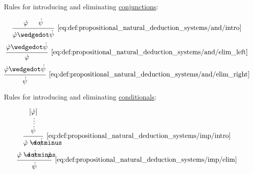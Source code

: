 \begin{definition}
\begin{thmenum}
     Rules for introducing and eliminating \hyperref[def:propositional_alphabet/connectives/conjunction]{conjunctions}:
    \begin{ThreeColumns}
      \begin{equation*}\taglabel[\( \wedge^+ \)]{eq:def:propositional_natural_deduction_systems/and/intro}
        \begin{prooftree}
          \hypo{ \syn\varphi }
          \hypo{ \syn\psi }
          \infer2[\ref{eq:def:propositional_natural_deduction_systems/and/intro}]{ \syn\varphi \synwedge \syn\psi }
        \end{prooftree}
      \end{equation*}
    \BeginSecondColumn
      \begin{equation*}\taglabel[\( \wedge^{-_L} \)]{eq:def:propositional_natural_deduction_systems/and/elim_left}
        \begin{prooftree}
          \hypo{ \syn\varphi \synwedge \syn\psi }
          \infer1[\ref{eq:def:propositional_natural_deduction_systems/and/elim_left}]{ \syn\varphi }
        \end{prooftree}
      \end{equation*}
    \BeginThirdColumn
      \begin{equation*}\taglabel[\( \wedge^{-_R} \)]{eq:def:propositional_natural_deduction_systems/and/elim_right}
        \begin{prooftree}
          \hypo{ \syn\varphi \synwedge \syn\psi }
          \infer1[\ref{eq:def:propositional_natural_deduction_systems/and/elim_right}]{ \syn\psi }
        \end{prooftree}
      \end{equation*}
    \end{ThreeColumns}

     Rules for introducing and eliminating \hyperref[def:propositional_alphabet/connectives/conditional]{conditionals}:
    \begin{TwoColumns}
      \begin{equation*}\taglabel[\( \rightarrow^+ \)]{eq:def:propositional_natural_deduction_systems/imp/intro}
        \begin{prooftree}
          \hypo{ [\syn\varphi] }
          \ellipsis {} { \syn\psi }
          \infer1[\ref{eq:def:propositional_natural_deduction_systems/imp/intro}]{ \syn\varphi \synimplies \syn\psi }
        \end{prooftree}
      \end{equation*}
    \BeginSecondColumn
      \begin{equation*}\taglabel[\( \rightarrow^- \)]{eq:def:propositional_natural_deduction_systems/imp/elim}
        \begin{prooftree}
          \hypo{ \syn\varphi \synimplies \syn\psi }
          \hypo{ \syn\varphi }
          \infer2[\ref{eq:def:propositional_natural_deduction_systems/imp/elim}]{ \syn\psi }
        \end{prooftree}
      \end{equation*}
    \end{TwoColumns}


\end{thmenum}
\end{definition}
